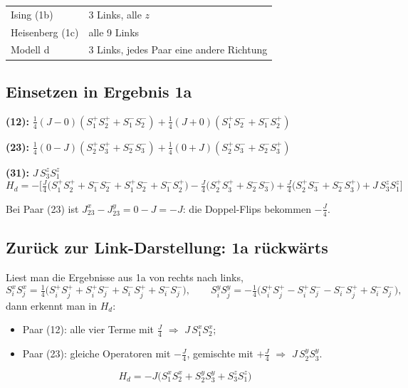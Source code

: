 \documentclass[11pt,a4paper]{article}
\begin{document}
\begin{center}
\begin{tabular}{@{}ll@{}}
\toprule
Ising (1b) & 3 Links, alle $z$\\
Heisenberg (1c) & alle 9 Links\\
Modell d & 3 Links, jedes Paar eine andere Richtung\\
\bottomrule
\end{tabular}
\end{center}

\subsection{Einsetzen in Ergebnis 1a}

\begin{rechnung}
\textbf{(12):} $\tfrac14(J-0)(S^+_1S^+_2+S^-_1S^-_2) + \tfrac14(J+0)(S^+_1S^-_2+S^-_1S^+_2)$

\textbf{(23):} $\tfrac14(0-J)(S^+_2S^+_3+S^-_2S^-_3) + \tfrac14(0+J)(S^+_2S^-_3+S^-_2S^+_3)$

\textbf{(31):} $J\,S^z_3S^z_1$
\[
H_d = -\Big[\tfrac J4\big(S^+_1S^+_2 + S^-_1S^-_2 + S^+_1S^-_2 + S^-_1S^+_2\big)
- \tfrac J4\big(S^+_2S^+_3 + S^-_2S^-_3\big) + \tfrac J4\big(S^+_2S^-_3 + S^-_2S^+_3\big)
+ J\,S^z_3S^z_1\Big]
\]
\end{rechnung}

\begin{falle}
Bei Paar (23) ist $J^x_{23} - J^y_{23} = 0 - J = -J$: die Doppel-Flips bekommen $-\tfrac J4$.
\end{falle}

\subsection{Zurück zur Link-Darstellung: 1a rückwärts}

Liest man die Ergebnisse aus 1a von rechts nach links,
\[
S^x_iS^x_j = \tfrac14\big(S^+_iS^+_j + S^+_iS^-_j + S^-_iS^+_j + S^-_iS^-_j\big),\qquad
S^y_iS^y_j = -\tfrac14\big(S^+_iS^+_j - S^+_iS^-_j - S^-_iS^+_j + S^-_iS^-_j\big),
\]
dann erkennt man in $H_d$:
\begin{itemize}[itemsep=2pt]
\item Paar (12): alle vier Terme mit $\tfrac J4$ $\Rightarrow$ $J\,S^x_1S^x_2$;
\item Paar (23): gleiche Operatoren mit $-\tfrac J4$, gemischte mit $+\tfrac J4$ $\Rightarrow$ $J\,S^y_2S^y_3$.
\end{itemize}
\begin{tcolorbox}[colback=yellow!6,colframe=orange!70!black,fonttitle=\bfseries,title=Hamiltonian Modell d]
\[
H_d = -J\big(S^x_1S^x_2 + S^y_2S^y_3 + S^z_3S^z_1\big)
\]
\end{tcolorbox}
\end{document}
